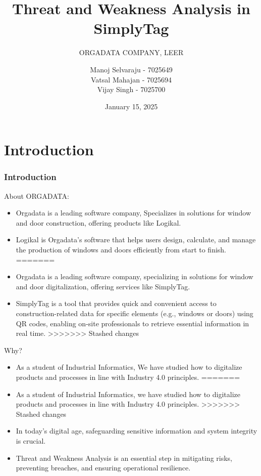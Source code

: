 \documentclass[10pt, a4paper]{beamer}
\title{Threat and Weakness Analysis in SimplyTag}
\subtitle{ORGADATA COMPANY, LEER}
\author{
	Manoj Selvaraju - 7025649 \\ 
	Vatsal Mahajan - 7025694\\ 
	Vijay Singh - 7025700
}
\date{January 15, 2025}
\begin{document}
	
	
	
	
	
	\section{Introduction}
	\begin{frame}
		\frametitle{Introduction}
		
		\begin{block}{About ORGADATA:}
			\begin{itemize}
<<<<<<< Updated upstream
				\item Orgadata is a leading software company, Specializes in solutions for window and door construction, offering products like Logikal.
				\item Logikal is Orgadata's software that helps users design, calculate, and manage the production of windows and doors efficiently from start to finish.
=======
				\item Orgadata is a leading software company, specializing in solutions for window and door digitalization, offering services like SimplyTag.
				\item SimplyTag is a tool that provides quick and convenient access to construction-related data for specific elements (e.g., windows or doors) using QR codes, enabling on-site professionals to retrieve essential information in real time.
>>>>>>> Stashed changes
			\end{itemize}
		\end{block}
		
		\begin{block}{Why?}
			\begin{itemize}
<<<<<<< Updated upstream
				\item As a student of Industrial Informatics, We have studied how to digitalize products and processes in line with Industry 4.0 principles.
=======
				\item As a student of Industrial Informatics, we have studied how to digitalize products and processes in line with Industry 4.0 principles.
>>>>>>> Stashed changes
				\item In today’s digital age, safeguarding sensitive information and system integrity is crucial.
				\item Threat and Weakness Analysis is an essential step in mitigating risks, preventing breaches, and ensuring operational resilience.	
			\end{itemize}
		\end{block}
		
	\end{frame}
	
\end{document}
